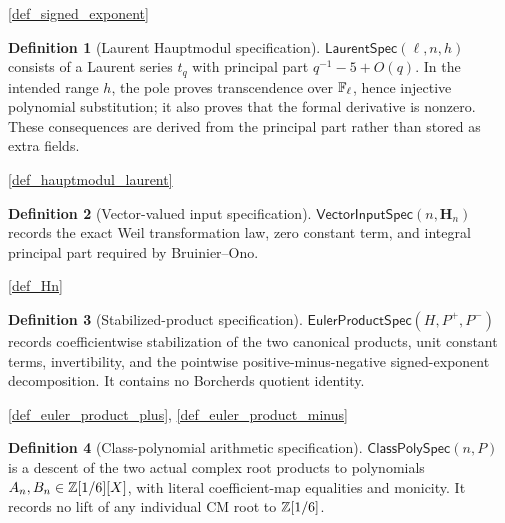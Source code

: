 \documentclass[11pt,a4paper]{article}
\numberwithin{equation}{section}
\theoremstyle{plain}\newtheorem{theorem}{Theorem}[section]\newaliascnt{proposition}{theorem}\newtheorem{proposition}[proposition]{Proposition}\aliascntresetthe{proposition}\newaliascnt{lemma}{theorem}\newtheorem{lemma}[lemma]{Lemma}\aliascntresetthe{lemma}
\theoremstyle{definition}\newaliascnt{definition}{theorem}\newtheorem{definition}[definition]{Definition}\aliascntresetthe{definition}\newaliascnt{notation}{theorem}\newtheorem{notation}[notation]{Notation}\aliascntresetthe{notation}
\providecommand{\lean}[1]{}\providecommand{\leanok}{}
\begin{document}
\begin{uses-statement}\ref{def_signed_exponent}\end{uses-statement}
\begin{definition}[Laurent Hauptmodul specification]\label{def_laurent_spec}\lean{SptCM.Repair.LaurentHauptmodulData}\leanok
$\mathsf{LaurentSpec}(\ell,n,h)$ consists of a Laurent series $t_q$ with
principal part $q^{-1}-5+O(q)$.  In the intended range $h$, the pole proves
transcendence over $\mathbb F_\ell$, hence injective polynomial substitution; it also
proves that the formal derivative is nonzero.  These consequences are derived
from the principal part rather than stored as extra fields.
\end{definition}
\begin{uses-statement}\ref{def_hauptmodul_laurent}\end{uses-statement}
\begin{definition}[Vector-valued input specification]\label{def_vector_input_spec}\lean{SptCM.Analytic.Repaired.VectorInputSpec}\leanok
$\mathsf{VectorInputSpec}(n,\mathbf H_n)$ records the exact Weil transformation law, zero constant term, and integral principal part required by Bruinier--Ono.
\end{definition}
\begin{uses-statement}\ref{def_Hn}\end{uses-statement}
\begin{definition}[Stabilized-product specification]\label{def_euler_product_spec}\lean{SptCM.Repair.EulerProductSpec}\leanok
$\mathsf{EulerProductSpec}(H,P^+,P^-)$ records coefficientwise stabilization of the two canonical products, unit constant terms, invertibility, and the pointwise positive-minus-negative signed-exponent decomposition.  It contains no Borcherds quotient identity.
\end{definition}
\begin{uses-statement}\ref{def_euler_product_plus}, \ref{def_euler_product_minus}\end{uses-statement}
\begin{definition}[Class-polynomial arithmetic specification]\label{def_class_poly_spec}\lean{SptCM.CM.Repaired.ActualClassPolynomialSpec}\leanok
$\mathsf{ClassPolySpec}(n,P)$ is a descent of the two actual complex root products to polynomials $A_n,B_n\in\mathbb Z[1/6][X]$, with literal coefficient-map equalities and monicity.  It records no lift of any individual CM root to $\mathbb Z[1/6]$.
\end{definition}
\end{document}
